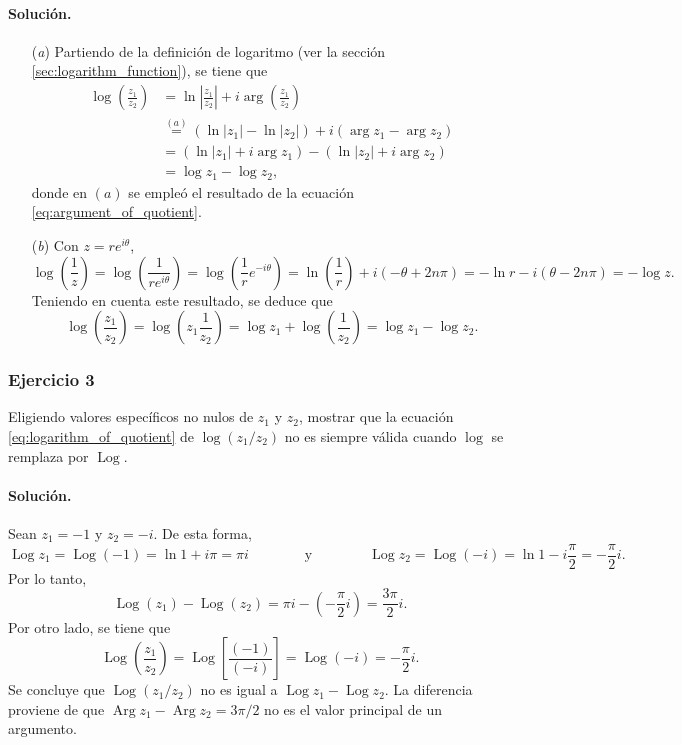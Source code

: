 \documentclass[a4paper]{report}
\DeclareMathOperator{\Arg}{Arg}
\DeclareMathOperator{\Log}{Log}
\begin{document}
\paragraph{Solución.} 

\begin{enumerate}
 \item[(\textit{a})] Partiendo de la definición de logaritmo (ver la sección \ref{sec:logarithm_function}), se tiene que 
 \begin{align*}
  \log\left(\frac{z_1}{z_2}\right)&=\ln\left|\frac{z_1}{z_2}\right|+i\arg\left(\frac{z_1}{z_2}\right)\\
   &\overset{(a)}{=}(\ln|z_1|-\ln|z_2|)+i(\arg z_1-\arg z_2)\\
   &=(\ln|z_1|+i\arg z_1)-(\ln|z_2|+i\arg z_2)\\
   &=\log z_1-\log z_2,
 \end{align*}
 donde en \((a)\) se empleó el resultado de la ecuación \ref{eq:argument_of_quotient}.
 \item[(\textit{b})] Con \(z=re^{i\theta}\),
 \[
  \log\left(\frac{1}{z}\right)=\log\left(\frac{1}{re^{i\theta}}\right)
  =\log\left(\frac{1}{r}e^{-i\theta}\right)
  =\ln\left(\frac{1}{r}\right)+i(-\theta+2n\pi)
  =-\ln r-i(\theta-2n\pi)=-\log z.
 \]
 Teniendo en cuenta este resultado, se deduce que 
 \[
  \log\left(\frac{z_1}{z_2}\right)=\log\left(z_1\frac{1}{z_2}\right)
  =\log z_1+\log\left(\frac{1}{z_2}\right)
  =\log z_1-\log z_2.
 \]
\end{enumerate} 

\subsubsection{Ejercicio 3}

Eligiendo valores específicos no nulos de \(z_1\) y \(z_2\), mostrar que la ecuación \ref{eq:logarithm_of_quotient} de \(\log(z_1/z_2)\) no es siempre válida cuando \(\log\) se remplaza por \(\Log\).

\paragraph{Solución.} Sean \(z_1=-1\) y \(z_2=-i\). De esta forma,
\[
 \Log z_1=\Log(-1)=\ln1+i\pi=\pi i
 \qquad\qquad\textrm{y}\qquad\qquad
 \Log z_2=\Log(-i)=\ln1-i\frac{\pi}{2}=-\frac{\pi}{2}i.
\]
Por lo tanto,
\[
 \Log(z_1)-\Log(z_2)=\pi i-\left(-\frac{\pi}{2}i\right)=\frac{3\pi}{2}i.
\]
Por otro lado, se tiene que 
\[
 \Log\left(\frac{z_1}{z_2}\right)=\Log\left[\frac{(-1)}{(-i)}\right]
 =\Log(-i)=-\frac{\pi}{2}i.
\]
Se concluye que \(\Log(z_1/z_2)\) no es igual a \(\Log z_1-\Log z_2\). La diferencia proviene de que \(\Arg z_1-\Arg z_2=3\pi/2\) no es el valor principal de un argumento.
\end{document}
